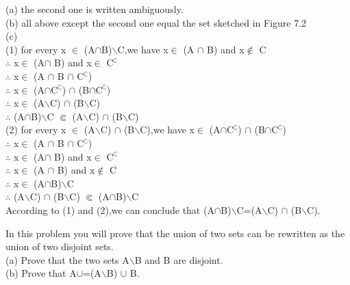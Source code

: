 \documentclass[11pt, a4paper, UTF8]{ctexart}
\begin{document}
\begin{solution}
(a) the second one is written ambiguously.\\
(b) all above except the second one equal the set sketched in Figure 7.2\\
(c)\\
(1) for every x $\in$ (A$\cap$B)$\backslash$C,we have x$\in$ (A $\cap$ B) and x$\notin$ C\\
$\therefore$ x$\in$ (A$\cap$ B) and x$\in$ C$^\complement$\\
$\therefore$ x$\in$ (A $\cap$ B $\cap$ C$^\complement$)\\
$\therefore$ x$\in$ (A$\cap$C$^\complement$) $\cap$ (B$\cap$C$^\complement$)\\
$\therefore$ x$\in$ (A$\backslash$C) $\cap$ (B$\backslash$C)\\
$\therefore$ (A$\cap$B)$\backslash$C $\Subset$ (A$\backslash$C) $\cap$ (B$\backslash$C)\\
(2) for every x $\in$ (A$\backslash$C) $\cap$ (B$\backslash$C),we have x$\in$ (A$\cap$C$^\complement$) $\cap$ (B$\cap$C$^\complement$)\\
$\therefore$ x$\in$ (A $\cap$ B $\cap$ C$^\complement$)\\
$\therefore$ x$\in$ (A$\cap$ B) and x$\in$ C$^\complement$\\
$\therefore$ x$\in$ (A $\cap$ B) and x$\notin$ C\\
$\therefore$ x$\in$ (A$\cap$B)$\backslash$C\\
$\therefore$ (A$\backslash$C) $\cap$ (B$\backslash$C) $\Subset$ (A$\cap$B)$\backslash$C\\
According to (1) and (2),we can conclude that (A$\cap$B)$\backslash$C=(A$\backslash$C) $\cap$ (B$\backslash$C).\\
\end{solution}


\begin{problem}[UD:7.9]
In this problem you will prove that the union of two sets can be rewritten as the union of two disjoint sets.\\
(a) Prove that the two sets A$\backslash$B and B are disjoint.\\
(b) Prove that A$\cup$=(A$\backslash$B) $\cup$ B.
\end{problem}
\end{document}
